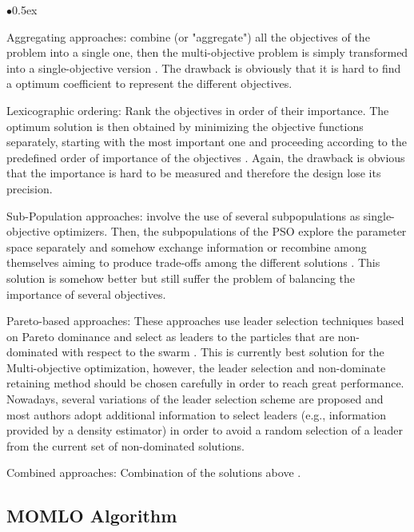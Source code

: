 \documentclass[11pt, runningheads,a4paper]{llncs}
\begin{document}
\begin{list}{$\bullet$}{\itemsep 0.5ex}

\item Aggregating approaches: combine (or "aggregate") all the objectives of the problem into a single one, then the multi-objective problem is simply transformed into a single-objective version \cite{ag1,ag2}. The drawback is obviously that it is hard to find a optimum coefficient to represent the different objectives.

\item Lexicographic ordering: Rank the objectives in order of their importance. The optimum solution is then obtained by minimizing the objective functions separately, starting with the most important one and proceeding according to the predefined order of importance of the objectives \cite{lo1}. Again, the drawback is obvious that the importance is hard to be measured and therefore the design lose its precision.

\item Sub-Population approaches: involve the use of several subpopulations as single-objective optimizers. Then, the subpopulations of the PSO explore the parameter space separately and somehow exchange information or recombine among themselves aiming to produce trade-offs among the different solutions \cite{sp1,sp2}. This solution is somehow better but still suffer the problem of balancing the importance of several objectives.

\item Pareto-based approaches: These approaches use leader selection techniques based on Pareto dominance and select as leaders to the particles that are non-dominated with respect to the swarm \cite{pb1,pb2,pb3,pb4,pb5}. This is currently best solution for the Multi-objective optimization, however, the leader selection and non-dominate retaining method should be chosen carefully in order to reach great performance. Nowadays, several variations of the leader selection scheme are proposed and most authors adopt additional information to select leaders (e.g., information provided by a density estimator) in order to avoid a random selection of a leader from the current set of non-dominated solutions.

\item Combined approaches: Combination of the solutions above \cite{cb1,cb2}.

\end{list}

\subsection{MOMLO Algorithm}
\end{document}
